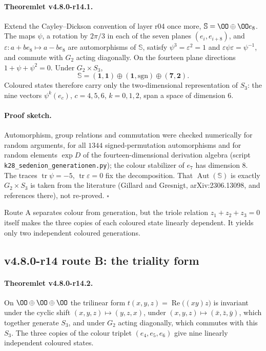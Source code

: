\paragraph{Theoremlet v4.8.0-r14.1.}
Extend the Cayley--Dickson convention of layer r04 once more, \(\mathbb S=\OO\oplus\OO e_8\).  The maps
\(\psi\), a rotation by \(2\pi/3\) in each of the seven planes \((e_i,e_{i+8})\), and \(\varepsilon\colon
a+be_8\mapsto a-be_8\) are automorphisms of \(\mathbb S\), satisfy \(\psi^3=\varepsilon^2=1\) and
\(\varepsilon\psi\varepsilon=\psi^{-1}\), and commute with \(G_2\) acting diagonally.  On the fourteen plane
directions \(1+\psi+\psi^2=0\).  Under \(G_2\times S_3\),
\[
\mathbb S=(\mathbf1,\mathbf1)\oplus(\mathbf1,\mathrm{sgn})\oplus(\mathbf7,\mathbf2).
\]
Coloured states therefore carry only the two-dimensional representation of \(S_3\): the nine vectors
\(\psi^k(e_c)\), \(c=4,5,6\), \(k=0,1,2\), span a space of dimension \(6\).

\paragraph{Proof sketch.}
Automorphism, group relations and commutation were checked numerically for random arguments, for all \(1344\)
signed-permutation automorphisms and for random elements \(\exp D\) of the fourteen-dimensional derivation
algebra (script \texttt{k28\_sedenion\_generationen.py}); the colour stabilizer of \(e_7\) has dimension \(8\).
The traces \(\operatorname{tr}\psi=-5\), \(\operatorname{tr}\varepsilon=0\) fix the decomposition.  That
\(\operatorname{Aut}(\mathbb S)\) is exactly \(G_2\times S_3\) is taken from the literature (Gillard and
Gresnigt, arXiv:2306.13098, and references there), not re-proved.  \(\square\)

Route A separates colour from generation, but the triole relation \(z_1+z_2+z_3=0\) itself makes the three
copies of each coloured state linearly dependent.  It yields only two independent coloured generations.

\subsection*{v4.8.0-r14 route B: the triality form}
\label{subsec:v480-r14-triality}

\paragraph{Theoremlet v4.8.0-r14.2.}
On \(\OO\oplus\OO\oplus\OO\) the trilinear form \(t(x,y,z)=\operatorname{Re}\bigl((xy)z\bigr)\) is invariant under the
cyclic shift \((x,y,z)\mapsto(y,z,x)\), under \((x,y,z)\mapsto(\bar x,\bar z,\bar y)\), which together generate
\(S_3\), and under \(G_2\) acting diagonally, which commutes with this \(S_3\).  The three copies of the colour
triplet \((e_4,e_5,e_6)\) give nine linearly independent coloured states.

